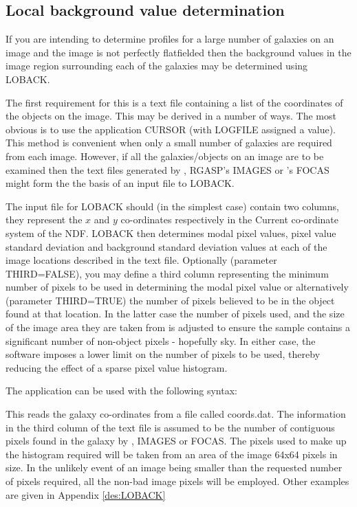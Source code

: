 \documentclass[twoside,11pt]{starlink}
\begin{document}
\subsection{Local background value determination}

If you are intending to determine profiles for a large number of
galaxies on an image and the image is not perfectly flatfielded
then the background values in the image region surrounding
each of the galaxies may be determined using LOBACK.

The first requirement for this is a text file containing a list of the
coordinates of the objects on the image. This may be derived
in a number of ways. The most obvious is to use the  application
CURSOR (with LOGFILE assigned a value). This method is convenient
when only a small number of galaxies are required from each image.
However, if all the galaxies/objects on an image are to be examined then
the text files generated by , RGASP's IMAGES or
's FOCAS might
form the the basis of an input file to LOBACK.

The input file for LOBACK should (in the simplest case) contain two
columns, they represent the $x$ and $y$ co-ordinates respectively
in the Current co-ordinate system of the NDF.
LOBACK then determines modal pixel values, pixel value standard deviation
and background standard deviation
values at each of the image locations described in the text file. Optionally
(parameter THIRD=FALSE),
you may define a third column representing the minimum number
of pixels to be used in determining the modal pixel value or alternatively
(parameter THIRD=TRUE) the number of pixels believed to be in the object found
at that location. In the latter case the number of pixels used, and the
size of the image area they are taken from is adjusted to ensure the sample
contains a significant number of non-object pixels - hopefully sky.
In either case, the software imposes a lower limit on the number of pixels
to be used, thereby reducing the effect of a sparse pixel value histogram.

The application can be used with the following syntax:

\begin{terminalv}
\end{terminalv}

This reads the galaxy co-ordinates from a file called coords.dat. The
information in the third column of the text file is assumed to be the
number of contiguous pixels found in the galaxy by ,
IMAGES or FOCAS. The
pixels used to make up the histogram required will be taken from an
area of the image 64x64 pixels in size. In the unlikely event
of an image being smaller than the requested number of pixels required,
all the non-bad image pixels will be employed. Other examples are given in
Appendix \ref{des:LOBACK}
\end{document}
